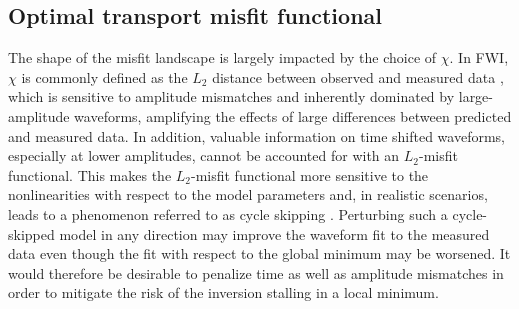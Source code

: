 \documentclass[12pt]{iopart}
\begin{document}
\subsection{Optimal transport misfit functional} 
The shape of the misfit landscape is largely impacted by the choice of $\chi$. In FWI, $\chi$ is commonly defined as the $L_2$ distance between observed and measured data \cite{Tarantola_1988,Pratt_1998}, which is sensitive to amplitude mismatches and inherently dominated by large-amplitude waveforms, amplifying the effects of large differences between predicted and measured data. In addition, valuable information on time shifted waveforms, especially at lower amplitudes, cannot be accounted for with an $L_2$-misfit functional. This makes the $L_2$-misfit functional more sensitive to the nonlinearities with respect to the model parameters and, in realistic scenarios, leads to a phenomenon referred to as cycle skipping \cite{Virieux_Operto_2009,Warner_Guasch_2016}. Perturbing such a cycle-skipped model in any direction may improve the waveform fit to the measured data even though the fit with respect to the global minimum may be worsened. It would therefore be desirable to penalize time as well as amplitude mismatches in order to mitigate the risk of the inversion stalling in a local minimum. 
\end{document}
